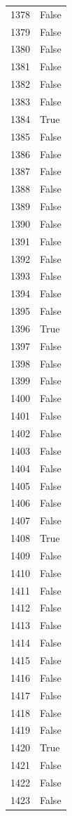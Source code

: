 \documentclass[
  letterpaper,
  DIV=11,
  numbers=noendperiod]{scrreprt}
\begin{document}
\begin{tabular}{ll}
1378 &  False \\
1379 &  False \\
1380 &  False \\
1381 &  False \\
1382 &  False \\
1383 &  False \\
1384 &   True \\
1385 &  False \\
1386 &  False \\
1387 &  False \\
1388 &  False \\
1389 &  False \\
1390 &  False \\
1391 &  False \\
1392 &  False \\
1393 &  False \\
1394 &  False \\
1395 &  False \\
1396 &   True \\
1397 &  False \\
1398 &  False \\
1399 &  False \\
1400 &  False \\
1401 &  False \\
1402 &  False \\
1403 &  False \\
1404 &  False \\
1405 &  False \\
1406 &  False \\
1407 &  False \\
1408 &   True \\
1409 &  False \\
1410 &  False \\
1411 &  False \\
1412 &  False \\
1413 &  False \\
1414 &  False \\
1415 &  False \\
1416 &  False \\
1417 &  False \\
1418 &  False \\
1419 &  False \\
1420 &   True \\
1421 &  False \\
1422 &  False \\
1423 &  False \\

\end{tabular}
\end{document}

